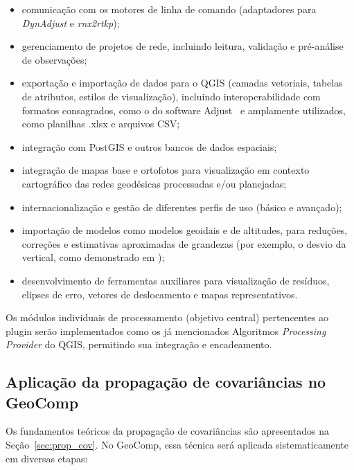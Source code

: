 \documentclass[
        12pt,                           %
        openright,                      %
        oneside,
        a4paper,                        %
        chapter=TITLE,         %
        section=TITLE,         %
        subsection=Title,      %
        english,                        %
        portugues,                      %
        ]{abntex2}
\begin{document}
\begin{itemize}
    \item comunicação com os motores de linha de comando (adaptadores para \textit{DynAdjust} e \textit{rnx2rtkp});
    \item gerenciamento de projetos de rede, incluindo leitura, validação e pré-análise de observações;
    \item exportação e importação de dados para o QGIS (camadas vetoriais, tabelas de atributos, estilos de visualização), incluindo interoperabilidade com formatos consagrados, como o do software Adjust~\cite{Ghilani2010} e amplamente utilizados, como planilhas .xlsx e arquivos CSV;
    \item integração com PostGIS e outros bancos de dados espaciais;
    \item integração de mapas base e ortofotos para visualização em contexto cartográfico das redes geodésicas processadas e/ou planejadas;
    \item internacionalização e gestão de diferentes perfis de uso (básico e avançado);
    \item importação de modelos como modelos geoidais e de altitudes, para reduções, correções e estimativas aproximadas de grandezas (por exemplo, o desvio da vertical, como demonstrado em \cite{Franca2021_deflection_vertical});
    \item desenvolvimento de ferramentas auxiliares para visualização de resíduos, elipses de erro, vetores de deslocamento e mapas representativos.
\end{itemize}

Os módulos individuais de processamento (objetivo central) pertencentes ao plugin serão implementados como os já mencionados Algoritmos \textit{Processing Provider} do QGIS, permitindo sua integração e encadeamento. 

\subsection{Aplicação da propagação de covariâncias no GeoComp}

Os fundamentos teóricos da propagação de covariâncias são apresentados na Seção~\ref{sec:prop_cov}. No GeoComp, essa técnica será aplicada sistematicamente em diversas etapas:
\end{document}
